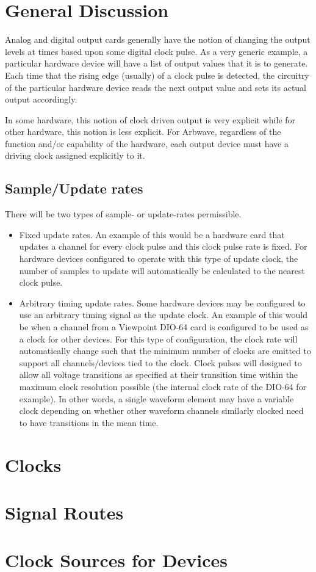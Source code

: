 \section{General Discussion}
Analog and digital output cards generally have the notion of changing the output
levels at times based upon some digital clock pulse.  As a very generic example,
a particular hardware device will have a list of output values that it is to
generate.  Each time that the rising edge (usually) of a clock pulse is
detected, the circuitry of the particular hardware device reads the next output
value and sets its actual output accordingly.

In some hardware, this notion of clock driven output is very explicit while for
other hardware, this notion is less explicit.  For Arbwave, regardless of the
function and/or capability of the hardware, each output device must have a
driving clock assigned explicitly to it.

\subsection{Sample/Update rates}
There will be two types of sample- or update-rates permissible.
\begin{itemize}
\item  Fixed update rates.
  An example of this would be a hardware card that updates a channel for every
  clock pulse and this clock pulse rate is fixed.  For hardware devices
  configured to operate with this type of update clock, the number of samples
  to update will automatically be calculated to the nearest clock pulse.
\item  Arbitrary timing update rates.
  Some hardware devices may be configured to use an arbitrary timing signal as
  the update clock.  An example of this would be when a channel from a
  Viewpoint DIO-64 card is configured to be used as a clock for other devices.
  For this type of configuration, the clock rate will automatically change
  such that the minimum number of clocks are emitted to support all
  channels/devices tied to the clock.  Clock pulses will designed to allow
  all voltage transitions as specified at their transition time within the
  maximum clock resolution possible (the internal clock rate of the DIO-64 for
  example).  In other words, a single waveform element may have a variable
  clock depending on whether other waveform channels similarly clocked need to
  have transitions in the mean time.
\end{itemize}



\section{Clocks}
\section{Signal Routes}
\section{Clock Sources for Devices}
